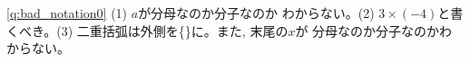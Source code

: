 



\ref{q:bad_notation0} (1) $a$が分母なのか分子なのか
わからない。(2) $3\times(-4)$と書くべき。(3) 二重括弧は外側を\{\}に。また, 末尾の$x$が
分母なのか分子なのかわからない。


\mv

